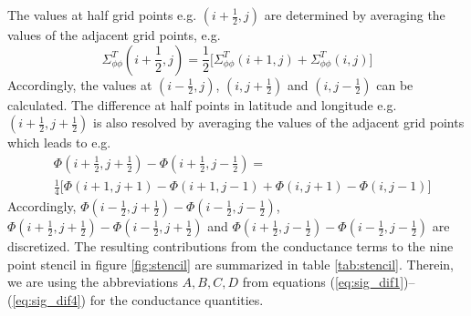 %
The values at half grid points e.g. $(i+\frac{1}{2},j)$ are determined
by averaging the values of the adjacent grid points, e.g.
%
\begin{equation}
 \Sigma_{\phi \phi}^T(i+\frac{1}{2},j) = \frac{1}{2}
   \bigl[ \Sigma_{\phi \phi}^T(i+1,j) +  \Sigma_{\phi \phi}^T(i,j) \bigr]
\end{equation}
%
Accordingly, the values at $(i-\frac{1}{2},j)$, $(i,j+\frac{1}{2})$ and
$(i,j-\frac{1}{2})$ can be calculated. The difference at half points
in latitude and longitude e.g.  $(i+\frac{1}{2},j+\frac{1}{2})$
is also resolved by averaging the values of the adjacent grid 
points which leads to e.g.
%
\begin{equation}
\begin{split}
 &\Phi(i+\frac{1}{2},j+\frac{1}{2}) - \Phi(i+\frac{1}{2},j-\frac{1}{2}) =  \\
 &  \frac{1}{4}
   \bigl[ \Phi(i+1,j+1) -\Phi(i+1,j-1) + \Phi(i,j+1)- \Phi(i,j-1) \bigr]
\end{split}
\end{equation}
%
Accordingly, $\Phi(i-\frac{1}{2},j+\frac{1}{2}) - \Phi(i-\frac{1}{2},j-\frac{1}{2})$,
$\Phi(i+\frac{1}{2},j+\frac{1}{2}) - \Phi(i-\frac{1}{2},j+\frac{1}{2})$ and
$\Phi(i+\frac{1}{2},j-\frac{1}{2}) - \Phi(i-\frac{1}{2},j-\frac{1}{2})$ are discretized.
The resulting contributions from the conductance terms to the nine 
point stencil in figure \ref{fig:stencil}
are summarized in table \ref{tab:stencil}. 
Therein, we are using the abbreviations $A, B, C, D$  from equations
(\ref{eq:sig_dif1})--(\ref{eq:sig_dif4}) for the conductance quantities.
%
